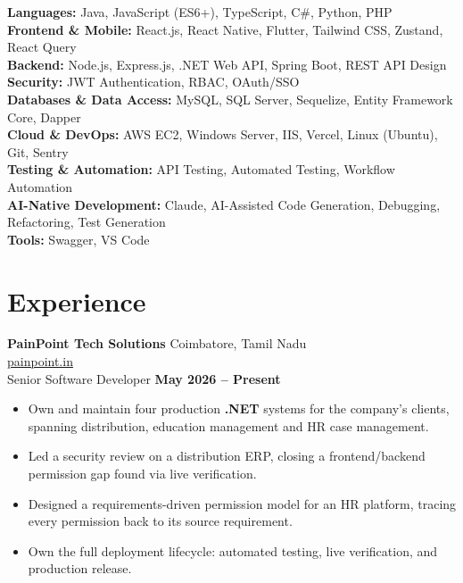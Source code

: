 \documentclass[letterpaper,10pt]{article}
\newcommand{\resumeItem}[1]{\item \small{#1}}
\newcommand{\resumeItemListStart}{\begin{itemize}[leftmargin=*, noitemsep, label={\color{accent}\textbullet}]}
\newcommand{\resumeItemListEnd}{\end{itemize}}
\newcommand{\duration}[1]{\textbf{\color{accent}#1}}
\begin{document}
\small{
\textbf{Languages:} Java, JavaScript (ES6+), TypeScript, C\#, Python, PHP \\

\textbf{Frontend \& Mobile:} React.js, React Native, Flutter, Tailwind CSS, Zustand, React Query \\

\textbf{Backend:} Node.js, Express.js, .NET Web API, Spring Boot, REST API Design \\

\textbf{Security:} JWT Authentication, RBAC, OAuth/SSO \\

\textbf{Databases \& Data Access:} MySQL, SQL Server, Sequelize, Entity Framework Core, Dapper \\

\textbf{Cloud \& DevOps:} AWS EC2, Windows Server, IIS, Vercel, Linux (Ubuntu), Git, Sentry \\

\textbf{Testing \& Automation:} API Testing, Automated Testing, Workflow Automation \\

\textbf{AI-Native Development:} Claude, AI-Assisted Code Generation, Debugging, Refactoring, Test Generation \\

\textbf{Tools:} Swagger, VS Code \\
}

\section{Experience}

\textbf{PainPoint Tech Solutions} \hfill {\color{muted}Coimbatore, Tamil Nadu} \\
{\color{accent}\href{https://painpoint.in/}{painpoint.in}} \\
Senior Software Developer \hfill \duration{May 2026 -- Present}

\resumeItemListStart
\resumeItem{Own and maintain four production \textbf{.NET} systems for the company's clients, spanning distribution, education management and HR case management.}
\resumeItem{Led a security review on a distribution ERP, closing a frontend/backend permission gap found via live verification.}
\resumeItem{Designed a requirements-driven permission model for an HR platform, tracing every permission back to its source requirement.}
\resumeItem{Own the full deployment lifecycle: automated testing, live verification, and production release.}
\resumeItemListEnd
\end{document}
